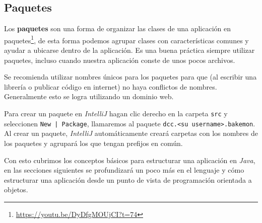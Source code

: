 \subsection{Paquetes}
  Los \textbf{paquetes} son una forma de organizar las clases de una aplicación en 
  paquetes\footnote{\url{https://youtu.be/DyDfgMOUjCI?t=74}}, de esta forma podemos agrupar clases 
  con características comunes y ayudar a ubicarse dentro de la aplicación.
  Es una buena práctica siempre utilizar paquetes, incluso cuando nuestra aplicación conste de unos 
  pocos archivos.

  Se recomienda utilizar nombres únicos para los paquetes para que (al escribir una librería o 
  publicar código en internet) no haya conflictos de nombres.
  Generalmente esto se logra utilizando un dominio web.

  Para crear un paquete en \textit{IntelliJ} hagan clic derecho en la carpeta \texttt{src} y 
  seleccionen \texttt{New | Package}, llamaremos al paquete \texttt{dcc.<su username>.bakemon}.
  Al crear un paquete, \textit{IntelliJ} automáticamente creará carpetas con los nombres de los 
  paquetes y agrupará los que tengan prefijos en común.

  Con esto cubrimos los conceptos básicos para estructurar una aplicación en \textit{Java}, en las 
  secciones siguientes se profundizará un poco más en el lenguaje y cómo estructurar una aplicación
  desde un punto de vista de programación orientada a objetos.
